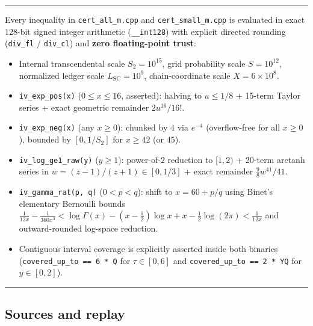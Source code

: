 \documentclass[11pt]{article}
\theoremstyle{remark}
\numberwithin{equation}{section}
\newenvironment{transcription}{\par\medskip\noindent\rule{\linewidth}{0.4pt}\par\nopagebreak}{\par\nopagebreak\noindent\rule{\linewidth}{0.4pt}\par\medskip}
\begin{document}
\begin{transcription}
Every inequality in \texttt{cert\_all\_m.cpp} and \texttt{cert\_small\_m.cpp} is evaluated in exact 128-bit signed integer arithmetic (\texttt{\_\_int128}) with explicit directed rounding (\texttt{div\_fl} / \texttt{div\_cl}) and \textbf{zero floating-point trust}:
\begin{itemize}
\item Internal transcendental scale $S_2 = 10^{15}$, grid probability scale $S = 10^{12}$, normalized ledger scale $L_{\mathrm{SC}} = 10^9$, chain-coordinate scale $X = 6 \times 10^8$.
\item \texttt{iv\_exp\_pos(x)} ($0 \le x \le 16$, asserted): halving to $u \le 1/8$ + 15-term Taylor series + exact geometric remainder $2 u^{16}/16!$.
\item \texttt{iv\_exp\_neg(x)} (any $x \ge 0$): chunked by $4$ via $e^{-4}$ (overflow-free for all $x \ge 0$), bounded by $[0, 1/S_2]$ for $x \ge 42$ (or $45$).
\item \texttt{iv\_log\_ge1\_raw(y)} ($y \ge 1$): power-of-2 reduction to $[1, 2)$ + 20-term arctanh series in $w = (z-1)/(z+1) \in [0, 1/3]$ + exact remainder $\frac{9}{8} w^{41}/41$.
\item \texttt{iv\_gamma\_rat(p, q)} ($0 < p < q$): shift to $x = 60 + p/q$ using Binet's elementary Bernoulli bounds $\frac{1}{12x} - \frac{1}{360x^3} < \log\Gamma(x) - (x-\frac{1}{2})\log x + x - \frac{1}{2}\log(2\pi) < \frac{1}{12x}$ and outward-rounded log-space reduction.
\item Contiguous interval coverage is explicitly asserted inside both binaries (\texttt{covered\_up\_to == 6 * Q} for $\tau \in [0, 6]$ and \texttt{covered\_up\_to == 2 * YQ} for $y \in [0, 2]$).
\end{itemize}
\end{transcription}

\subsection{Sources and replay}\label{sec:ord-sources}
\end{document}
